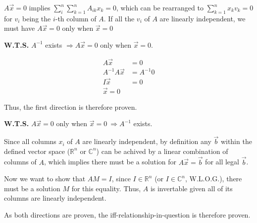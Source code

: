 \documentclass[11pt]{article}
\begin{document}
$A \vec{x} = 0$ implies $\sum\limits_{i}^{n} \sum\limits_{k = 1}^{n} A_{ik} x_{k} = 0$, which can be rearranged to $\sum\limits_{k = 1}^{n} x_k v_k = 0$ for $v_i$ being the $i$-th column of $A$. If all the $v_i$ of $A$ are linearly independent, we must have $A \vec{x} = 0$ only when $\vec{x} = 0$\newline

\textbf{W.T.S.} $A^{-1}$ exists $\Longrightarrow A \vec{x} = 0$  only when $\vec{x} = 0$.

\begin{align*}
    A \vec{x} &= 0 \\
    A^{-1} A \vec{x} &= A^{-1} 0 \\
    I \vec{x} &= 0 \\
    \vec{x} = 0
\end{align*}

Thus, the first direction is therefore proven.\newline

\textbf{W.T.S.} $A \vec{x} = 0$ only when $\vec{x} = 0 \ \Longrightarrow A^{-1}$ exists.

Since all columns $x_i$ of $A$ are linearly independent, by definition any $\vec{b}$ within the defined vector space ($\mathbb{R}^n$ or $\mathbb{C}^n$) can be achived by a linear combination of columns of $A$, which implies there must be a solution for $A \vec{x} = \vec{b}$ for all legal $\vec{b}$.

Now we want to show that $AM = I$, since $I \in \mathbb{R}^n$ (or $I \in \mathbb{C}^n$, W.L.O.G.), there must be a solution $M$ for this equality. Thus, $A$ is invertable given all of its columns are linearly independent.\newline

As both directions are proven, the iff-relationship-in-question is therefore proven.
\end{document}

